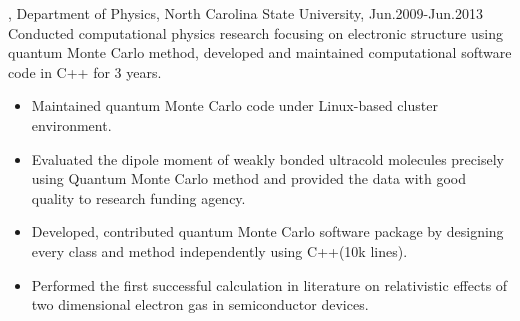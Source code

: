 \documentclass[11pt]{article} %
\begin{document}
, Department of Physics, North Carolina State University, Jun.2009-Jun.2013\\
\noindent Conducted computational physics research focusing on electronic structure using quantum Monte Carlo method, developed and maintained computational software code in C++ for 3 years.\\
\begin{itemize}
\item Maintained quantum Monte Carlo code under Linux-based cluster environment.\\
\vspace{-4mm}  
\item Evaluated the dipole moment of weakly bonded ultracold molecules precisely using Quantum Monte Carlo method and provided the data with good quality to research funding agency.\\
\vspace{-4mm}
  \item Developed, contributed quantum Monte Carlo software package by designing every class and method independently using C++(10k lines).\\
\vspace{-4mm}
  \item Performed the first successful calculation in literature on relativistic effects of two dimensional electron gas in semiconductor devices.\\
\end{itemize}


\vspace{0mm}
\end{document}
